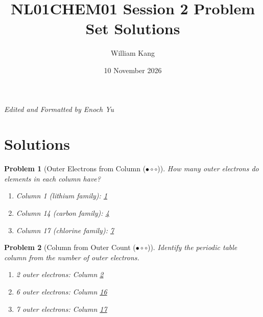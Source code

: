 \documentclass[a4paper,11pt]{article}
\title{\textbf{NL01CHEM01 Session 2 Problem Set Solutions}}
\date{10 November 2026}
\author{William Kang}
\newcommand{\easy}{(\ensuremath{\bullet \circ \circ})}
\theoremstyle{listprobstyle}
\newtheorem{problem}{Problem}
\begin{document}
\maketitle
\begin{center}
    \small\textit{Edited and Formatted by Enoch Yu}
\end{center}

\section{Solutions}
\begin{problem}[Outer Electrons from Column \easy]
How many outer electrons do elements in each column have?
\vspace{-0.6\baselineskip}
\begin{enumerate}[label=\alph*),itemsep=0pt,parsep=0pt,topsep=0pt]
\item Column 1 (lithium family):
    \underline{\textcolor{BrickRed}{\phantom{X}1\phantom{X}}}
\vspace{0.5\baselineskip}
\item Column 14 (carbon family):
    \underline{\textcolor{BrickRed}{\phantom{X}4\phantom{X}}}
\vspace{0.5\baselineskip}
\item Column 17 (chlorine family):
    \underline{\textcolor{BrickRed}{\phantom{X}7\phantom{X}}}
\end{enumerate}
\end{problem}

\begin{problem}[Column from Outer Count \easy]
Identify the periodic table column from the number of outer electrons.
\vspace{-0.6\baselineskip}
\begin{enumerate}[label=\alph*),itemsep=0pt,parsep=0pt,topsep=0pt]
\item 2 outer electrons:
    Column
    \underline{\textcolor{BrickRed}{\phantom{X}2\phantom{X}}}
\vspace{0.5\baselineskip}
\item 6 outer electrons:
    Column
    \underline{\textcolor{BrickRed}{\phantom{X}16\phantom{X}}}
\vspace{0.5\baselineskip}
\item 7 outer electrons:
    Column
    \underline{\textcolor{BrickRed}{\phantom{X}17\phantom{X}}}
\end{enumerate}
\end{problem}
\end{document}

